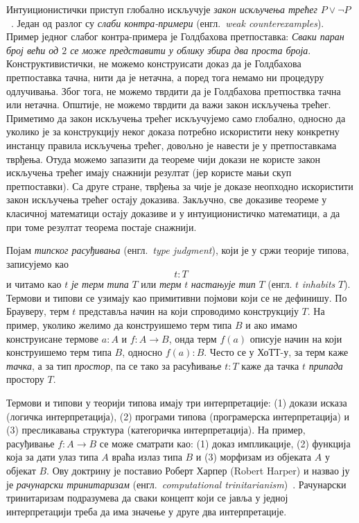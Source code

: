 \documentclass[12pt,oneside]{memoir}
\begin{document}
Интуиционистички приступ глобално искључује \emph{закон искључења трећег} $P \lor \neg P$~\cite{brw07, van17}. Један од разлог су \emph{слаби контра-примери} (енгл.~\emph{weak counterexamples}). Пример једног слабог контра-примера је Голдбахова претпоставка: \emph{Сваки паран број већи од $2$ се може представити у облику збира два проста броја}.  Конструктивистички, не можемо конструисати доказ да је Голдбахова претпоставка тачна, нити да је нетачна, а поред тога немамо ни процедуру одлучивања. Због тога, не можемо тврдити да је Голдбахова претпоствка тачна или нетачна. Општије, не можемо тврдити да важи закон искључења трећег. Приметимо да закон искључења трећег искључујемо само глобално, односно да уколико је за конструкцију неког доказа потребно искористити неку конкретну инстанцу правила искључења трећег, довољно је навести је у претпоставкама тврђења. Отуда можемо запазити да теореме чији докази не користе закон искључења трећег имају снажнији резултат (јер користе мањи скуп претпоставки). Са друге стране, тврђења за чије је доказе неопходно искористити закон искључења трећег остају доказива. Закључно, све доказиве теореме у класичној математици остају доказиве и у интуиционистичко математици, а да при томе резултат теорема постаје снажнији.

Појам \emph{типског расуђивања} (енгл.~\emph{type judgment}), који је у сржи теорије типова, записујемо као  \[t : T\] и читамо као $t$ \emph{је терм типа} $T$ или \emph{терм} $t$ \emph{настањује тип} $T$ (енгл. $t$ \emph{inhabits} $T$). Термови и типови се узимају као примитивни појмови који се не дефинишу. По Брауверу, терм $t$ представља начин на који спроводимо конструкцију $T$. На пример, уколико желимо да конструишемо терм типа $B$ и ако имамо конструисане термове $a : A$ и $f : A \to B$, онда терм $f(a)$ описује начин на који конструишемо терм типа $B$, односно $f(a) : B$. Често се у ХоТТ-у, за терм каже \emph{тачка}, а за тип \emph{простор}, па се тако за расућивање $t : T$ каже да тачка $t$ \emph{припада} простору $T$.

Термови и типови у теорији типова имају три интерпретације: (1) докази исказа (логичка интерпретација), (2) програми типова (програмерска интерпретација) и (3) пресликавања структура (категоричка интерпретација). На пример, расуђивање $f : A \to B$ се може сматрати као: (1) доказ импликације, (2) функција која за дати улаз типа $A$ враћа излаз типа $B$ и (3) морфизам из објеката $A$ у објекат $B$. Ову доктрину је поставио Роберт Харпер (Robert Harper) и назвао ју је \emph{рачунарски тринитаризам} (енгл.~\emph{computational trinitarianism})~\cite{rob11}. Рачунарски тринитаризам подразумева да сваки концепт који се јавља у једној интерпретацији треба да има значење у друге два интерпретације.  
\end{document}
